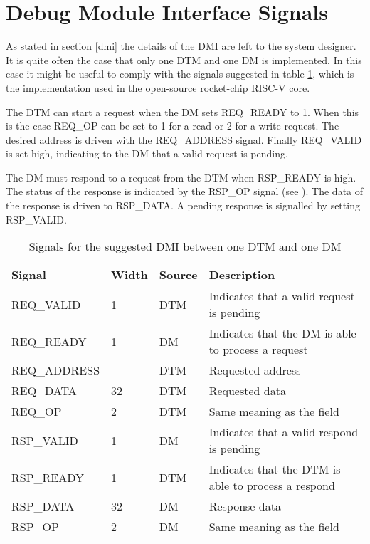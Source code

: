 \section{Debug Module Interface Signals} \label{dmi_signals}

As stated in section \ref{dmi} the details of the DMI are left to the system designer.
It is quite often the case that only one DTM and one DM is implemented.
In this case it might be useful to comply with the signals suggested in table \ref{tab:dmi_signals},
which is the implementation used in the open-source \href{https://github.com/chipsalliance/rocket-chip/blob/375045a7db1bdc7b4f7851f1a59b3f10a2b922ff/src/main/scala/devices/debug/Debug.scala#L170}{rocket-chip} RISC-V core.

The DTM can start a request when the DM sets REQ\_READY to 1.
When this is the case REQ\_OP can be set to 1 for a read or 2 for a write request.
The desired address is driven with the REQ\_ADDRESS signal.
Finally REQ\_VALID is set high, indicating to the DM that a valid request is pending.

The DM must respond to a request from the DTM when RSP\_READY is high.
The status of the response is indicated by the RSP\_OP signal (see \FdtmDmiOp).
The data of the response is driven to RSP\_DATA.
A pending response is signalled by setting RSP\_VALID.

\begin{table}[ht]\centering
	\begin{tabular}[h]{l l l l}
		\hline
		Signal 			& Width				& Source	& Description 		  \\
		\hline
		REQ\_VALID 		& 1					& DTM		& Indicates that a valid request is pending \\
		\hline
		REQ\_READY 		& 1					& DM		& Indicates that the DM is able to process a request \\
		\hline
		REQ\_ADDRESS	& \FdtmDtmcsAbits	& DTM		& Requested address \\
		\hline
		REQ\_DATA		& 32				& DTM		& Requested data \\
		\hline
		REQ\_OP 		& 2					& DTM		& Same meaning as the \FdtmDmiOp field\\
		\hline
		RSP\_VALID 		& 1					& DM		& Indicates that a valid respond is pending \\
		\hline
		RSP\_READY		& 1					& DTM		& Indicates that the DTM is able to process a respond \\
		\hline
		RSP\_DATA		& 32				& DM		& Response data \\
		\hline
		RSP\_OP			& 2					& DM		& Same meaning as the \FdtmDmiOp field\\
		\hline
	\end{tabular}
	\caption{Signals for the suggested DMI between one DTM and one DM \label{tab:dmi_signals}}
\end{table}

